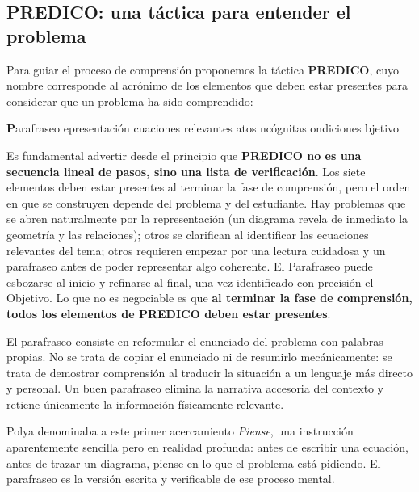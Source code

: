 \documentclass[11pt]{book}
\begin{document}
\begin{enumerate}
\subsection*{PREDICO: una táctica para entender el problema}

Para guiar el proceso de comprensión proponemos la táctica {\bf PREDICO}, cuyo nombre corresponde al acrónimo de los elementos que deben estar presentes para considerar que un problema ha sido comprendido:

\begin{center}
{\bf P}arafraseo epresentación cuaciones relevantes atos ncógnitas ondiciones bjetivo
\end{center}

Es fundamental advertir desde el principio que {\bf PREDICO no es una secuencia lineal de pasos, sino una lista de verificación}. Los siete elementos deben estar presentes al terminar la fase de comprensión, pero el orden en que se construyen depende del problema y del estudiante. Hay problemas que se abren naturalmente por la representación (un diagrama revela de inmediato la geometría y las relaciones); otros se clarifican al identificar las ecuaciones relevantes del tema; otros requieren empezar por una lectura cuidadosa y un parafraseo antes de poder representar algo coherente. El Parafraseo puede esbozarse al inicio y refinarse al final, una vez identificado con precisión el Objetivo. Lo que no es negociable es que {\bf al terminar la fase de comprensión, todos los elementos de PREDICO deben estar presentes}.

\medskip
{}
\medskip

El parafraseo consiste en reformular el enunciado del problema con palabras propias. No se trata de copiar el enunciado ni de resumirlo mecánicamente: se trata de demostrar comprensión al traducir la situación a un lenguaje más directo y personal. Un buen parafraseo elimina la narrativa accesoria del contexto y retiene únicamente la información físicamente relevante.

Polya \cite{Polya1945} denominaba a este primer acercamiento {\it Piense}, una instrucción aparentemente sencilla pero en realidad profunda: antes de escribir una ecuación, antes de trazar un diagrama, piense en lo que el problema está pidiendo. El parafraseo es la versión escrita y verificable de ese proceso mental.

\medskip
{}
\medskip


\end{enumerate}
\end{document}

